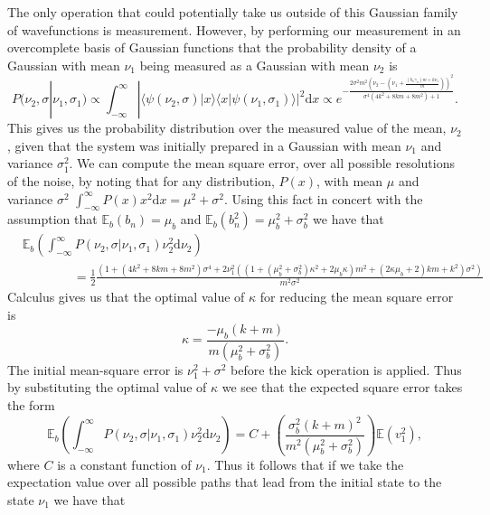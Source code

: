 \documentclass[superscriptaddress,aps,pra,nofootinbib,onecolumn,notitlepage,10pt]{revtex4-1}
\newcommand{\braket}[2]{\langle #1|#2\rangle}
\begin{document}
The only operation that could potentially take us outside of this Gaussian family of wavefunctions is measurement.  However, by performing our measurement in an overcomplete basis of Gaussian functions that the probability density of a Gaussian with mean $\nu_1$ being measured as a Gaussian with mean $\nu_2$ is 
\begin{equation}
P(\nu_2,\sigma|\nu_1,\sigma_1) \propto \int_{-\infty}^\infty |\braket{\psi(\nu_2,\sigma)}{x}\braket{x}{\psi(\nu_1,\sigma_1)}|^2 \mathrm{d}x\propto  e^{-\frac{2\sigma^2 m^2 \left(\nu_2 -\left (\nu_1 + \frac{(b_n\gamma_n)m + k\nu_1}{m}\right)\right)^2}{\sigma^4(4k^2+8km+8m^2)+1}}.
\end{equation}
This gives us the probability distribution over the measured value of the mean, $\nu_2$, given that the system was initially prepared in a Gaussian with mean $\nu_1$ and variance $\sigma_1^2$.  We can compute the mean square error, over all possible resolutions of the noise, by noting that for any distribution, $P(x)$, with mean $\mu$ and variance $\sigma^2$ $\int_{-\infty}^\infty P(x)x^2 \mathrm{d}x = \mu^2 + \sigma^2$.  Using this fact in concert with the assumption that $\mathbb{E}_b (b_n) = \mu_b$ and $\mathbb{E}_b (b_n^2) = \mu_b^2 + \sigma_b^2$ we have that 
\begin{align}
&\mathbb{E}_b\left(\int_{-\infty}^\infty P(\nu_2,\sigma|\nu_1,\sigma_1) \nu_2^2\mathrm{d}\nu_2\right) \nonumber\\
&\qquad\qquad= \frac{1}{2}\frac{(1+(4k^2+8km+8m^2)\sigma^4+2\nu_1^2((1+(\mu_b^2+\sigma_b^2)\kappa^2+2\mu_b\kappa)m^2+(2\kappa\mu_b+2)km+k^2)\sigma^2)}{m^2\sigma^2}\label{eq:mse}
\end{align}
Calculus gives us that the optimal value of $\kappa$ for reducing the mean square error is
\begin{equation}
\kappa = \frac{-\mu_b(k+m)}{m(\mu_b^2 +\sigma_b^2)}.
\end{equation}
The initial mean-square error is $\nu_1^2 +\sigma^2$ before the kick operation is applied.  Thus by substituting the optimal value of $\kappa$ we see that the expected square error takes the form
\begin{equation}
\mathbb{E}_{b}\left(\int_{-\infty}^\infty P(\nu_2,\sigma|\nu_1,\sigma_1) \nu_2^2\mathrm{d}\nu_2\right) = C + \left(\frac{\sigma_b^2(k+m)^2}{m^2(\mu_b^2+\sigma_b^2)}\right)\mathbb{E}(v_1^2),
\end{equation}
where $C$ is a constant function of $\nu_1$.
Thus it follows that if we take the expectation value over all possible paths that lead from the initial state to the state $\nu_1$ we have that
\end{document}
